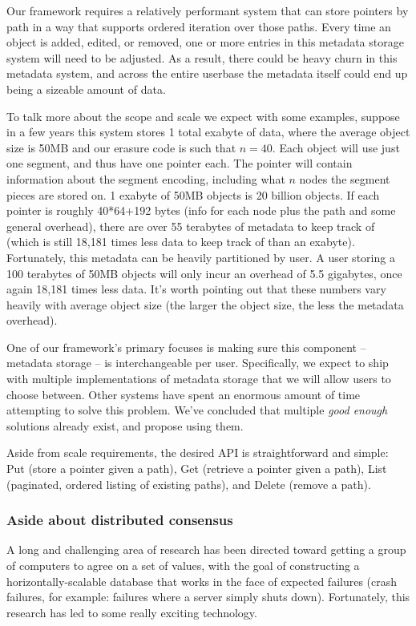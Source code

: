 \documentclass[a4paper,10pt]{article} \usepackage[utf8]{inputenc}
\begin{document}
Our framework requires a relatively performant system that can store pointers by
path in a way that supports ordered iteration over those paths. Every time an
object is added, edited, or removed, one or more entries in this metadata
storage system will need to be adjusted. As a result, there could be heavy churn
in this metadata system, and across the entire userbase the metadata itself
could end up being a sizeable amount of data.

To talk more about the scope and scale we expect with some examples, suppose in
a few years this system stores 1 total exabyte of data, where the average object
size is 50MB and our erasure code is such that $n=40$. Each object will use just
one segment, and thus have one pointer each. The pointer will contain
information about the segment encoding, including what $n$ nodes the segment
pieces are stored on. 1 exabyte of 50MB objects is 20 billion objects. If
each pointer is roughly 40*64+192 bytes (info for each node plus the path and
some general overhead), there are over 55 terabytes of metadata to keep track of
(which is still 18,181 times less data to keep track of than an exabyte).
Fortunately, this metadata can be heavily partitioned by user. A user storing a
100 terabytes of 50MB objects will only incur an overhead of 5.5 gigabytes, once
again 18,181 times less data. It's worth pointing out that these numbers vary
heavily with average object size (the larger the object size, the less the
metadata overhead).

One of our framework's primary focuses is making sure this component -- metadata
storage -- is interchangeable per user. Specifically, we expect to ship with
multiple implementations of metadata storage that we will allow users to choose
between. Other systems have spent an enormous amount of time attempting to solve
this problem. We've concluded that multiple {\em good enough} solutions already
exist, and propose using them.

Aside from scale requirements, the desired API is straightforward and
simple: Put (store a pointer given a path), Get (retrieve a pointer given a
path), List (paginated, ordered listing of existing paths), and Delete (remove a
path).

\subsubsection{Aside about distributed consensus}

A long and challenging area of research has been directed toward getting a
group of computers to agree on a set of values, with the goal of constructing a
horizontally-scalable database that works in the face of expected failures
(crash failures, for example: failures where a server simply shuts down).
Fortunately, this research has led to some really exciting technology.
\end{document}
